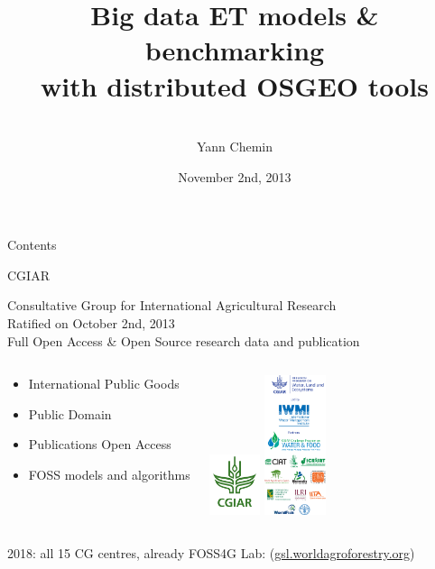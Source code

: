 \documentclass[xcolor=dvipsnames,beamer]{beamer} %
\title[HPC benchmarking ET models OSGEO]
{Big data ET models \& benchmarking\\
with distributed OSGEO tools}
\author[Yann Chemin]
{\vspace{50pt}\\
Yann Chemin}
\institute[IWMI]
{International Water Management Institute\\
 \vspace{5pt}
\begin{flushleft}
 \texttt{[image: ciacanolafield]}
\end{flushleft}
}
\date{\tiny November 2nd, 2013}
\begin{document}
\begin{frame}
 \maketitle
\end{frame}


\begin{frame}{Contents}
 \begin{multicols}{2}
  \setcounter{tocdepth}{2}  
  \tableofcontents
 \end{multicols} 
\end{frame}


\begin{frame}[fragile]{CGIAR}

Consultative Group for International Agricultural Research\\
Ratified on October 2nd, 2013\\
Full Open Access \& Open Source research data and publication
\newline

\begin{columns}[l]
\begin{center}
\begin{itemize}
 \item International Public Goods
 \item Public Domain
 \item Publications Open Access
 \item FOSS models and algorithms
\end{itemize}
\end{center}

\begin{center}
  \includegraphics[width=1.5cm]{CGIAR_Green}
  \hspace{5mm}
  \includegraphics[width=1.8cm]{WLE_and_partners-vertical_logo_strip.png}
\end{center}
\end{columns}
\vspace{5mm} 2018: all 15 CG centres, already FOSS4G Lab:
(\href{http://gsl.worldagroforestry.org}{gsl.worldagroforestry.org})
\end{frame}
\end{document}
